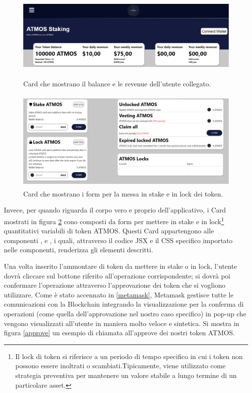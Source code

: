 \begin{figure}[t]
    \centering
    \includegraphics[width=14cm,height=4.5cm]{Immagini/Card1.png}
    \caption[Main Card per il balance e le revenue]{Card che mostrano il balance e le revenue dell'utente collegato.}
    \label{Card1}
\end{figure}
\begin{figure}[h]
    \centering
    \includegraphics[width=12cm,height=5cm]{Immagini/Card2.png}
    \caption[Card con i form per la messa in stake e in lock dei token]{Card che mostrano i form per la messa in stake e in lock dei token.}
    \label{Card2}
\end{figure}
Invece, per quando riguarda il corpo vero e proprio dell'applicativo, i Card mostrati in figura \ref{Card2} cono composti da form per mettere in stake e in lock\footnote{Il lock di token si riferisce a un periodo di tempo specifico in cui i token non possono essere inoltrati o scambiati.Tipicamente, viene utilizzato come strategia preventiva per mantenere un valore stabile a lungo termine di un particolare asset.} quantitativi variabili di token ATMOS. Questi Card appartengono alle componenti ,  e , i quali, attraverso il codice JSX e il CSS specifico importato nelle componenti, renderizza gli elementi descritti.

Una volta inserito l'ammontare di token da mettere in stake o in lock, l'utente dovrà cliccare sul bottone riferito all'operazione corrispondente; si dovrà poi confermare l'operazione attraverso l'approvazione dei token che si vogliono utilizzare. Come è stato accennato in \ref{metamask}, Metamask gestisce tutte le comunicazioni con la Blockchain integrando la visualizzazione per la conferma di operazioni (come quella dell'approvazione nel nostro caso specifico) in pop-up che vengono visualizzati all'utente in maniera molto veloce e sintetica. Si mostra in figura \ref{approve} un esempio di chiamata all'approve dei nostri token ATMOS.



